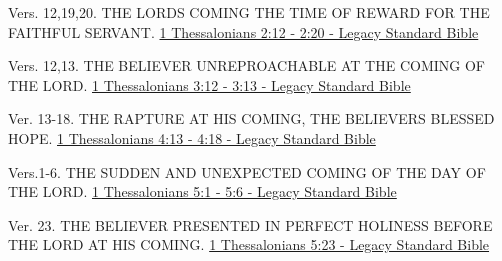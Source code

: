 \documentclass[
  ignorenonframetext,
]{beamer}
\begin{document}
\begin{frame}{2}
\label{section-221}
\begin{block}{Vers. 12,19,20. THE LORD\textquotesingle S COMING THE TIME
OF REWARD FOR THE FAITHFUL SERVANT.}
\label{vers.-121920.-the-lords-coming-the-time-of-reward-for-the-faithful-servant.}
\href{https://read.lsbible.org/?q=1th2\%3A12-20}{1 Thessalonians 2:12 -
2:20 - Legacy Standard Bible}
\end{block}
\end{frame}

\begin{frame}{3}
\label{section-222}
\begin{block}{Vers. 12,13. THE BELIEVER UNREPROACHABLE AT THE COMING OF
THE LORD.}
\label{vers.-1213.-the-believer-unreproachable-at-the-coming-of-the-lord.}
\href{https://read.lsbible.org/?q=1th3\%3A12-13}{1 Thessalonians 3:12 -
3:13 - Legacy Standard Bible}
\end{block}
\end{frame}

\begin{frame}{4}
\label{section-223}
\begin{block}{Ver. 13-18. THE RAPTURE AT HIS COMING, THE
BELIEVER\textquotesingle S BLESSED HOPE.}
\label{ver.-13-18.-the-rapture-at-his-coming-the-believers-blessed-hope.}
\href{https://read.lsbible.org/?q=1th4\%3A13-18}{1 Thessalonians 4:13 -
4:18 - Legacy Standard Bible}
\end{block}
\end{frame}

\begin{frame}{5}
\label{section-224}
\begin{block}{Vers.1-6. THE SUDDEN AND UNEXPECTED COMING OF THE DAY OF
THE LORD.}
\label{vers.1-6.-the-sudden-and-unexpected-coming-of-the-day-of-the-lord.}
\href{https://read.lsbible.org/?q=1th5\%3A1-6}{1 Thessalonians 5:1 - 5:6
- Legacy Standard Bible}
\end{block}

\begin{block}{Ver. 23. THE BELIEVER PRESENTED IN PERFECT HOLINESS BEFORE
THE LORD AT HIS COMING.}
\label{ver.-23.-the-believer-presented-in-perfect-holiness-before-the-lord-at-his-coming.}
\href{https://read.lsbible.org/?q=1th5\%3A23}{1 Thessalonians 5:23 -
Legacy Standard Bible}
\end{block}
\end{frame}
\end{document}
